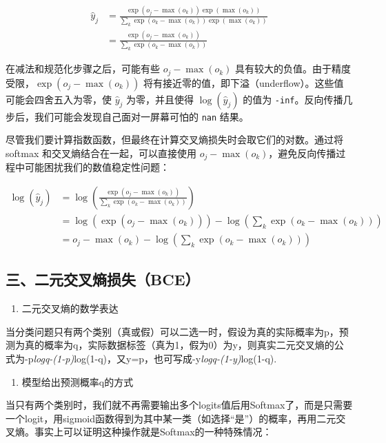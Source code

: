 \[
\begin{aligned}
\hat{y}_j
&=\frac{\exp(o_j-\max(o_k))\exp(\max(o_k))}
{\sum_k\exp(o_k-\max(o_k))\exp(\max(o_k))}\\
&=\frac{\exp(o_j-\max(o_k))}
{\sum_k\exp(o_k-\max(o_k))}
\end{aligned}
\]

在减法和规范化步骤之后，可能有些 \(o_j-\max(o_k)\) 具有较大的负值。由于精度受限，\(\exp(o_j-\max(o_k))\) 将有接近零的值，即下溢（underflow）。这些值可能会四舍五入为零，使 \(\hat{y}_j\) 为零，并且使得 \(\log(\hat{y}_j)\) 的值为 \texttt{-inf}。反向传播几步后，我们可能会发现自己面对一屏幕可怕的 \texttt{nan} 结果。

尽管我们要计算指数函数，但最终在计算交叉熵损失时会取它们的对数。通过将 softmax 和交叉熵结合在一起，可以直接使用 \(o_j-\max(o_k)\)，避免反向传播过程中可能困扰我们的数值稳定性问题：

\[
\begin{aligned}
\log(\hat{y}_j)
&=\log\left(\frac{\exp(o_j-\max(o_k))}
{\sum_k\exp(o_k-\max(o_k))}\right)\\
&=\log(\exp(o_j-\max(o_k)))
-\log\left(\sum_k\exp(o_k-\max(o_k))\right)\\
&=o_j-\max(o_k)-\log\left(\sum_k\exp(o_k-\max(o_k))\right)
\end{aligned}
\]

\hypertarget{ux4e09ux4e8cux5143ux4ea4ux53c9ux71b5ux635fux5931bce}{%
\subsection{三、二元交叉熵损失（BCE）}\label{ux4e09ux4e8cux5143ux4ea4ux53c9ux71b5ux635fux5931bce}}

\begin{enumerate}
\def\labelenumi{\arabic{enumi}.}
\tightlist
\item
  二元交叉熵的数学表达
\end{enumerate}

当分类问题只有两个类别（真或假）可以二选一时，假设为真的实际概率为p，预测为真的概率为q，实际数据标签（真为1，假为0）为y，则真实二元交叉熵的公式为-p\emph{logq-(1-p)}log(1-q)，又y=p，也可写成-y\emph{logq-(1-y)}log(1-q).

\begin{enumerate}
\def\labelenumi{\arabic{enumi}.}
\setcounter{enumi}{1}
\tightlist
\item
  模型给出预测概率q的方式
\end{enumerate}

当只有两个类别时，我们就不再需要输出多个logits值后用Softmax了，而是只需要一个logit，用sigmoid函数得到为其中某一类（如选择``是''）的概率，再用二元交叉熵。事实上可以证明这种操作就是Softmax的一种特殊情况：

